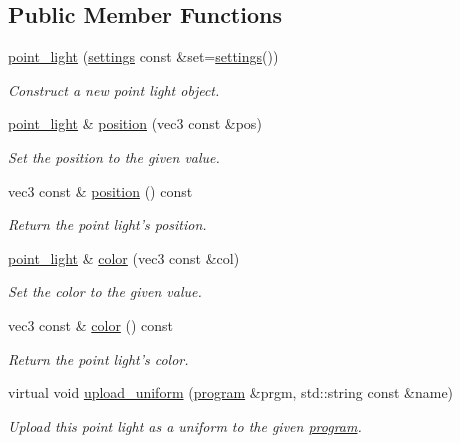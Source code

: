\subsection*{Public Member Functions}
\begin{DoxyCompactItemize}
\item 
\hyperlink{classgfx_1_1point__light_adeb313976364f094bff0cd8086b3ec3c}{point\-\_\-light} (\hyperlink{classgfx_1_1point__light_1_1settings}{settings} const \&set=\hyperlink{classgfx_1_1point__light_1_1settings}{settings}())
\begin{DoxyCompactList}\small\item\em Construct a new point light object. \end{DoxyCompactList}\item 
\hyperlink{classgfx_1_1point__light}{point\-\_\-light} \& \hyperlink{classgfx_1_1point__light_ad0e0fa27a2136f000e1e30de07309697}{position} (vec3 const \&pos)
\begin{DoxyCompactList}\small\item\em Set the position to the given value. \end{DoxyCompactList}\item 
vec3 const \& \hyperlink{classgfx_1_1point__light_a0794f094bebf222bc6b379fc31b26bf1}{position} () const 
\begin{DoxyCompactList}\small\item\em Return the point light's position. \end{DoxyCompactList}\item 
\hyperlink{classgfx_1_1point__light}{point\-\_\-light} \& \hyperlink{classgfx_1_1point__light_a3f481861cb135d189f4e65c2cf184547}{color} (vec3 const \&col)
\begin{DoxyCompactList}\small\item\em Set the color to the given value. \end{DoxyCompactList}\item 
vec3 const \& \hyperlink{classgfx_1_1point__light_a376b6bfddbb471eabca4a69042f35a91}{color} () const 
\begin{DoxyCompactList}\small\item\em Return the point light's color. \end{DoxyCompactList}\item 
virtual void \hyperlink{classgfx_1_1point__light_a9549403e263927018c000f857cb1e718}{upload\-\_\-uniform} (\hyperlink{classgfx_1_1program}{program} \&prgm, std\-::string const \&name)
\begin{DoxyCompactList}\small\item\em Upload this point light as a uniform to the given \hyperlink{classgfx_1_1program}{program}. \end{DoxyCompactList}\end{DoxyCompactItemize}
